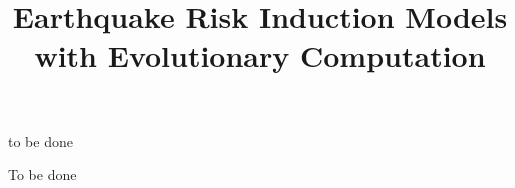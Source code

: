 \documentclass[bacharelado]{unb-cic}
\title{Earthquake Risk Induction Models with Evolutionary Computation}
\begin{document}
  \maketitle
  \pretextual

  \begin{agradecimentos}
  to be done
  \end{agradecimentos}
  \begin{resumo}
  To be done
  \end{resumo}
\end{document}
